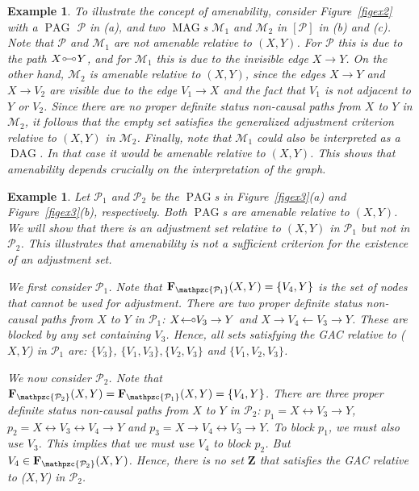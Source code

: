 \documentclass[]{article}
\DeclareMathOperator{\DAG}{DAG}
\DeclareMathOperator{\MAG}{MAG}
\DeclareMathOperator{\PAG}{PAG}
\newtheorem{example}[theorem]{Example}
\theoremstyle{definition}
\theoremstyle{remark}
\newcommand{\g}[1][G]{\mathcal{#1}}
\newcommand{\f}[2][X,Y]{\mathbf{F}_{\mathpzc{#2}}(#1)}
\newcommand{\arrowcirc}{
  \setlength{\unitlength}{1mm}
  \begin{picture}(5,1)(0,0)
    \put(0.2,0){$\leftarrow$}
    \put(4.3,1){\circle{1}}
  \end{picture}
}
\newcommand{\circcirc}{
  \setlength{\unitlength}{1mm}
  \begin{picture}(5,1)(0,0)
    \put(1,1){\circle{1}}
    \put(1.5,1){\line(1,0){2}}
    \put(4,1){\circle{1}}
  \end{picture}
}
\begin{document}
\begin{example}
   To illustrate the concept of amenability, consider Figure~\ref{figex2} with a $\PAG$ $\g[P]$ in (a), and two $\MAG$s $\g[M]_1$ and $\g[M]_2$ in $[\g[P]]$ in (b) and (c). Note that $\g[P]$ and $\g[M]_1$ are not amenable relative to $(X,Y)$. For $\g[P]$ this is due to the path $X \circcirc Y$, and for $\g[M]_1$ this is due to the invisible edge $X \to Y$. On the other hand, $\g[M]_2$ is amenable relative to $(X,Y)$, since the edges $X\to Y$ and $X \to V_2$ are visible due to the edge $V_1\to X$ and the fact that $V_1$ is not adjacent to $Y$ or $V_2$.
   Since there are no proper definite status non-causal paths from $X$ to $Y$ in $\g[M]_2$, it follows that the empty set satisfies the generalized adjustment criterion relative to $(X,Y)$ in $\g[M]_2$.
   Finally, note that $\g[M]_1$ could also be interpreted as a $\DAG$. In that case it would be amenable relative to $(X,Y)$. This shows that amenability depends crucially on the interpretation of the graph.
   \label{ex2}
\end{example}



\begin{example}
  Let $\g[P]_1$ and $\g[P]_2$ be the $\PAG$s in Figure~\ref{figex3}(a) and Figure~\ref{figex3}(b), respectively.
  Both $\PAG$s are amenable relative to $(X,Y)$. We will show that there is an adjustment set relative to $(X,Y)$ in $\g[P]_1$ but not in $\g[P]_2$. This illustrates that amenability is not a sufficient
  criterion for the existence of an adjustment set.

  We first consider $\g[P]_1$. Note that  $\f{\g[P]_1} = \{ V_4, Y \}$ is the set of nodes that cannot be used for adjustment.  There are two proper definite status non-causal paths from $X$ to $Y$ in $\g[P]_1$: $X \arrowcirc V_3 \rightarrow Y$ and $X \rightarrow V_4 \leftarrow V_3 \rightarrow Y$. These are blocked by any set containing $V_3$. Hence, all sets satisfying the GAC relative to ($X,Y$) in $\g[P]_1$ are: $\{ V_3 \}$, $\{V_1, V_3 \}, \{V_2, V_3 \}$ and $\{ V_1, V_2, V_3 \}$.

  We now consider $\g[P]_2$. Note that $\f{\g[P]_2} = \f{\g[P]_1} = \{ V_4, Y \}$. There are three proper definite status non-causal paths from $X$ to $Y$ in $\g[P]_2$:  $p_1 = X \leftrightarrow V_3 \rightarrow Y$, $p_2 = X \leftrightarrow V_3 \leftrightarrow V_4 \to Y$ and  $p_3 = X \rightarrow V_4 \leftrightarrow V_3 \rightarrow Y$. To block $p_1$, we must also use $V_3$. This implies that we must use $V_4$ to block $p_2$. But $V_4 \in \f{\g[P]_2}$. Hence, there is no set $\mathbf{Z}$ that satisfies the GAC relative to ($X,Y$) in $\g[P]_2$.
  \label{ex3}
\end{example}
\end{document}
